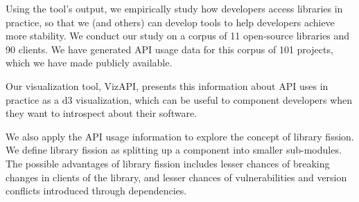 Using the tool's output, we empirically study how developers access libraries in practice, so that we (and others) can develop tools to help developers achieve more stability. We conduct our study on a corpus of 11 open-source libraries and 90 clients. We have generated API usage data for this corpus of 101 projects, which we have made publicly available. 

Our visualization tool, VizAPI, presents this information about API uses in practice as a d3 visualization, which can be useful to component developers when they want to introspect about their software. 

We also apply the API usage information to explore the concept of library fission. We define library fission as splitting up a component into smaller sub-modules. The possible advantages of library fission includes lesser chances of breaking changes in clients of the library, and lesser chances of vulnerabilities and version conflicts introduced through dependencies.

